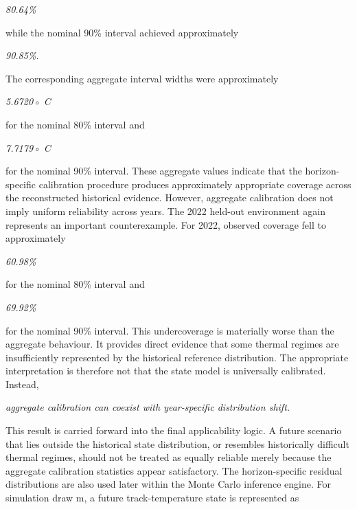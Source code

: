 \begin{center}\textit{80.64\%}\end{center}

while the nominal 90\% interval achieved approximately

\begin{center}\textit{90.85\%.}\end{center}

The corresponding aggregate interval widths were approximately

\begin{center}\textit{5.6720◦ C}\end{center}

for the nominal 80\% interval and

\begin{center}\textit{7.7179◦ C}\end{center}

for the nominal 90\% interval. These aggregate values indicate that the horizon-specific calibration procedure produces approximately appropriate coverage across the reconstructed historical evidence. However, aggregate calibration does not imply uniform reliability across years. The 2022 held-out environment again represents an important counterexample. For 2022, observed coverage fell to approximately

\begin{center}\textit{60.98\%}\end{center}

for the nominal 80\% interval and

\begin{center}\textit{69.92\%}\end{center}

for the nominal 90\% interval. This undercoverage is materially worse than the aggregate behaviour. It provides direct evidence that some thermal regimes are insufficiently represented by the historical reference distribution. The appropriate interpretation is therefore not that the state model is universally calibrated. Instead,

\begin{center}\textit{aggregate calibration can coexist with year-specific distribution shift.}\end{center}

This result is carried forward into the final applicability logic. A future scenario that lies outside the historical state distribution, or resembles historically difficult thermal regimes, should not be treated as equally reliable merely because the aggregate calibration statistics appear satisfactory. The horizon-specific residual distributions are also used later within the Monte Carlo inference engine. For simulation draw m, a future track-temperature state is represented as

